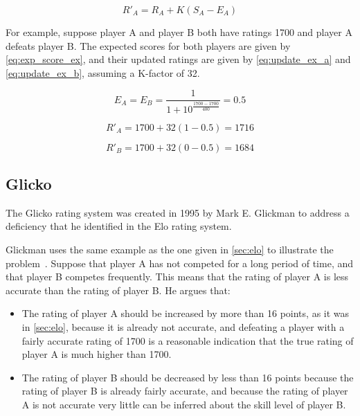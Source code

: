\begin{equation} \label{eq:update}
R'_A = R_A + K \left( S_A - E_A \right)
\end{equation}

For example, suppose player A and player B both have ratings 1700 and player A defeats player B.
The expected scores for both players are given by \autoref{eq:exp_score_ex}, and their updated ratings are given by \autoref{eq:update_ex_a} and \autoref{eq:update_ex_b}, assuming a K-factor of 32.

\begin{equation} \label{eq:exp_score_ex}
E_A = E_B = \frac{1}{1 + 10^\frac{1700 - 1700}{400}} = 0.5
\end{equation}

\begin{equation} \label{eq:update_ex_a}
R'_A = 1700 + 32 \left( 1 - 0.5 \right) = 1716
\end{equation}

\begin{equation} \label{eq:update_ex_b}
R'_B = 1700 + 32 \left( 0 - 0.5 \right) = 1684
\end{equation}

\subsection{Glicko}
\label{sec:glicko}
The Glicko rating system was created in 1995 by Mark E. Glickman to address a deficiency that he identified in the Elo rating system.

Glickman uses the same example as the one given in \autoref{sec:elo} to illustrate the problem~\citep{glicko}.
Suppose that player A has not competed for a long period of time, and that player B competes frequently.
This means that the rating of player A is less accurate than the rating of player B.
He argues that:

\begin{itemize}
	\item{The rating of player A should be increased by more than 16 points, as it was in \autoref{sec:elo}, because it is already not accurate, and defeating a player with a fairly accurate rating of 1700 is a reasonable indication that the true rating of player A is much higher than 1700.}
	\item{The rating of player B should be decreased by less than 16 points because the rating of player B is already fairly accurate, and because the rating of player A is not accurate very little can be inferred about the skill level of player B.}
\end{itemize}

